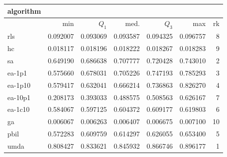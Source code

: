 \begin{tabular}{@{}l*{5}{>{{}}N{1}{3}}>{{}}N{2}{0}@{}}
\toprule
{algorithm} &  \\
\midrule
& {min} & {$Q_1$} & {med.} & {$Q_3$} & {max} & {rk}\\
\midrule
rls & 0.092007 & 0.093069 & 0.093587 & 0.094325 & 0.096757 & 8\\
hc & 0.018117 & 0.018196 & 0.018222 & 0.018267 & 0.018283 & 9\\
sa & 0.649190 & 0.686638 & 0.707777 & 0.720428 & 0.743010 & 2\\
ea-1p1 & 0.575660 & 0.678031 & 0.705226 & 0.747193 & 0.785293 & 3\\
ea-1p10 & 0.579417 & 0.632041 & 0.666214 & 0.736863 & 0.826270 & 4\\
ea-10p1 & 0.208173 & 0.393033 & 0.488575 & 0.508563 & 0.626167 & 7\\
ea-1c10 & 0.584067 & 0.597125 & 0.604372 & 0.609177 & 0.619803 & 6\\
ga & 0.006067 & 0.006263 & 0.006407 & 0.006675 & 0.007100 & 10\\
pbil & 0.572283 & 0.609759 & 0.614297 & 0.626055 & 0.653400 & 5\\
umda & {\color{blue}} 0.808427 & {\color{blue}} 0.833621 & {\color{blue}} 0.845932 & {\color{blue}} 0.866746 & {\color{blue}} 0.896177 & 1\\
\bottomrule
\end{tabular}
